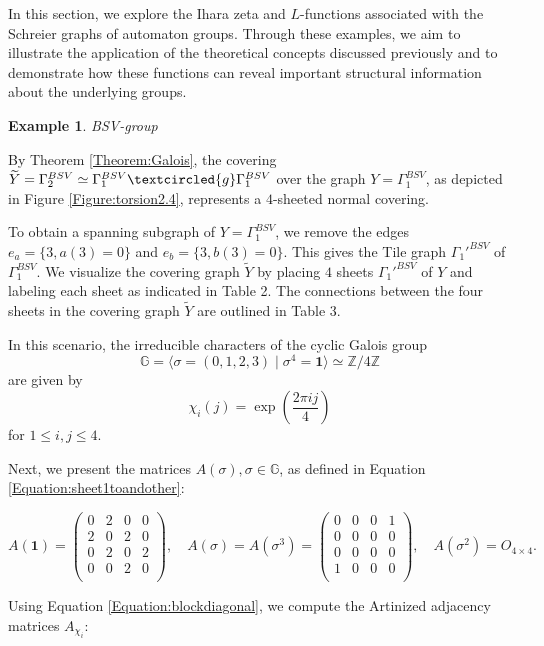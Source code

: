 \documentclass{article}
\newtheorem{myexa}{Example}[section]
\newcommand{\G}{\Gamma}
\newcommand{\gid}{\mathbf{1}}
\newcommand{\g}{\textcircled{g}}
\newcommand{\Gal}{\mathbb{G}}
\newcommand{\Y}{\widetilde{Y}}
\begin{document}
In this section, we explore the Ihara zeta and $L$-functions associated with the Schreier graphs of automaton groups. Through these examples, we aim to illustrate the application of the theoretical concepts discussed previously and to demonstrate how these functions can reveal important structural information about the underlying groups.

\begin{myexa} \label{Example:zeta-BSV} BSV-group \end{myexa}
By Theorem \ref{Theorem:Galois}, the covering $\Y = \G_2^{BSV} \simeq \G_1^{BSV} \g \G_1^{BSV}$ over the graph $Y = \G_1^{BSV}$, as depicted in Figure \ref{Figure:torsion2.4}, represents a $4$-sheeted normal covering. 

To obtain a spanning subgraph of $Y = \G_1^{BSV}$, we remove the edges $e_a = \{3, a(3) = 0\}$ and $e_b = \{3, b(3) = 0\}$. This gives the Tile graph $\G_1'^{BSV}$ of $\G_1^{BSV}$. We visualize the covering graph $\Y$ by placing $4$ sheets $\G_1'^{BSV}$ of $Y$ and labeling each sheet as indicated in Table 2. The connections between the four sheets in the covering graph $\Y$ are outlined in Table 3.

In this scenario, the irreducible characters of the cyclic Galois group $$\Gal = \langle \sigma = (0,1,2,3) \mid \sigma^4 = \gid \rangle \simeq \mathbb{Z}/4\mathbb{Z}$$ are given by $$\chi_i(j) = \exp\left(\frac{2\pi i j}{4}\right)$$ for $1 \leq i, j \leq 4.$

Next, we present the matrices $A(\sigma), \sigma \in \Gal$, as defined in Equation \eqref{Equation:sheet1toandother}:

$$
A(\gid) = \begin{pmatrix}
0 & 2 & 0 & 0 \\
2 & 0 & 2 & 0 \\
0 & 2 & 0 & 2 \\
0 & 0 & 2 & 0 \\
\end{pmatrix}, \quad
A(\sigma) = A(\sigma^3) = \begin{pmatrix}
0 & 0 & 0 & 1 \\
0 & 0 & 0 & 0 \\
0 & 0 & 0 & 0 \\
1 & 0 & 0 & 0 \\
\end{pmatrix}, \quad
A(\sigma^2) = O_{4 \times 4}.
$$

Using Equation \eqref{Equation:blockdiagonal}, we compute the Artinized adjacency matrices $A_{\chi_i}$:
\end{document}
